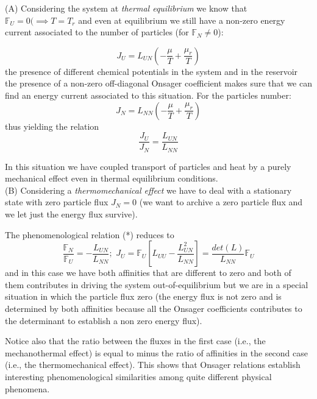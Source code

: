 \documentclass[\main/main.tex]{subfiles}
\begin{document}
(A) Considering the system at \textit{thermal equilibrium} we know that $\mathbb{F}_U=0 (\implies T=T_{r}$ and even at equilibrium we still have a non-zero energy current associated to the number of particles (for $\mathbb{F}_N\neq0$):

\begin{equation}
J_{U}=L_{U N}\left(-\frac{\mu}{T}+\frac{\mu_{r}}{T}\right) 
\end{equation}
the presence of different chemical potentials in the system and in the reservoir the presence of a non-zero off-diagonal Onsager coefficient makes sure that we can find an energy current associated to this situation. For the particles number:
\begin{equation}
    J_{N}=L_{N N}\left(-\frac{\mu}{T}+\frac{\mu_{r}}{T}\right) 
\end{equation}
thus yielding the relation
\begin{equation}
\frac{J_{U}}{J_{N}}=\frac{L_{U N}}{L_{N N}}
\end{equation}

In this situation we have coupled transport of particles and heat by a purely mechanical
effect even in thermal equilibrium conditions. \\

(B) Considering a \textit{thermomechanical effect} we have to deal with a stationary state with zero particle flux $J_N=0$ (we want to archive a zero particle flux and we let just the energy flux survive).

The phenomenological relation (*) reduces to 
\begin{equation}
\frac{\mathbb{F}_{N}}{\mathbb{F}_{U}}=-\frac{L_{U N}}{L_{N N}}; \,\, J_U=\mathbb{F}_U\left[L_{UU}-\frac{L_{UN}^2}{L_{NN}}\right]=\frac{det(L)}{L_{NN}}\mathbb{F}_U
\end{equation}
and in this case we have both affinities that are different  to zero and both of them contributes in driving the system out-of-equilibrium but we are in a special situation in which the particle flux zero (the energy flux is not zero and is determined by both affinities because all the Onsager coefficients contributes to the determinant to establish a non zero energy flux).

Notice also that the ratio between the fluxes in the first case (i.e., the mechanothermal
effect) is equal to minus the ratio of affinities in the second case (i.e., the thermomechanical
effect). This shows that Onsager relations establish interesting phenomenological similarities
among quite different physical phenomena.
\end{document}
